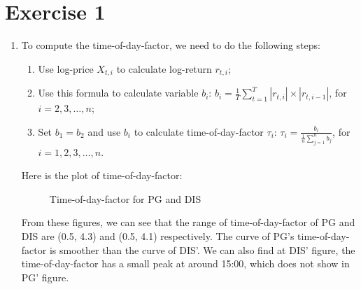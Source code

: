 \documentclass[12pt,letterpaper]{article}
\begin{document}
\section*{Exercise 1}
  \begin{enumerate}[label=\textbf{(\Alph*)}]
  \item To compute the time-of-day-factor, we need to do the following steps:
 	 \begin{enumerate}[label=(\roman*)]
  	    \item Use log-price $X_{t,i}$ to calculate log-return $r_{t,i}$;
  	    \item Use this formula to calculate variable $b_i$: $b_i=\frac{1}{T}\sum_{t=1}^{T}|r_{t,i}|\times |r_{t,i-1}|$, for ${i=2,3,\dots,n}$;
  	    \item Set $b_1=b_2$ and use $b_i$ to calculate time-of-day-factor $\tau_i$: $\tau_i=\frac{b_i}{\frac{1}{n}\sum_{j=1}^{n}b_j}$, for ${i=1,2,3,\dots,n}$.
  	\end{enumerate}
  Here is the plot of time-of-day-factor:
  \begin{figure}[H]
            \centering
            \caption{Time-of-day-factor for PG and DIS}
\end{figure}
From these figures, we can see that the range of time-of-day-factor of PG and DIS are (0.5, 4.3) and (0.5, 4.1) respectively. The curve of PG's time-of-day-factor is smoother than the curve of DIS'. We can also find at DIS' figure, the time-of-day-factor has a small peak at around 15:00, which does not show in PG' figure.\\


\end{enumerate}
\end{document}
